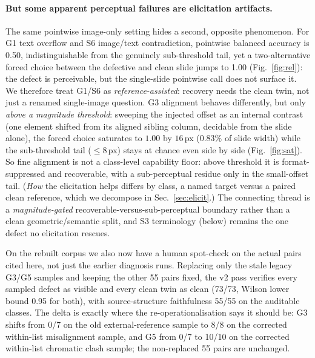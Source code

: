 \documentclass[10pt]{article}
\newcommand{\g}[1]{\textsf{#1}}        %
\begin{document}
\paragraph{But some apparent perceptual failures are elicitation artifacts.}
The same pointwise image-only setting hides a second, opposite phenomenon. For \g{G1} text overflow and \g{S6}
image/text contradiction, pointwise balanced accuracy is 0.50, indistinguishable from the genuinely
sub-threshold tail, yet a two-alternative forced choice between the defective and clean slide jumps to
1.00 (Fig.~\ref{fig:rel}): the defect is perceivable, but the single-slide pointwise call does not
surface it. We therefore treat \g{G1}/\g{S6} as \emph{reference-assisted}: recovery needs the clean twin, not
just a renamed single-image question. \g{G3} alignment behaves differently, but only \emph{above a magnitude threshold}: sweeping the
injected offset as an internal contrast (one element shifted from its aligned sibling column, decidable from the
slide alone), the forced choice saturates to $1.00$ by $16$\,px ($0.83\%$ of slide width) while the
sub-threshold tail ($\le8$\,px) stays at chance even side by side (Fig.~\ref{fig:sat}). So fine alignment is not
a class-level capability floor: above threshold it is format-suppressed and recoverable, with
a sub-perceptual residue only in the small-offset tail. (\emph{How} the elicitation helps differs by
class, a named target versus a paired clean reference, which we decompose in Sec.~\ref{sec:elicit}.) The
connecting thread is a \emph{magnitude-gated} recoverable-versus-sub-perceptual boundary rather than a
clean geometric/semantic split, and \g{S3} terminology (below) remains the one defect no elicitation rescues.

On the rebuilt corpus we also now have a human spot-check on the actual pairs cited here, not just the earlier
diagnosis runs. Replacing only the stale legacy \g{G3}/\g{G5} samples and keeping the other 55 pairs fixed,
the v2 pass verifies every sampled defect as visible and every clean twin as clean (73/73, Wilson lower bound
0.95 for both), with source-structure faithfulness 55/55 on the auditable classes. The delta is exactly where
the re-operationalisation says it should be: \g{G3} shifts from 0/7 on the old external-reference sample to
8/8 on the corrected within-list misalignment sample, and \g{G5} from 0/7 to 10/10 on the corrected
within-list chromatic clash sample; the non-replaced 55 pairs are unchanged.
\end{document}
